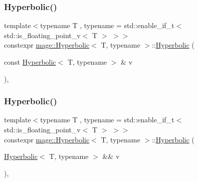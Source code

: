 \subsubsection{\texorpdfstring{Hyperbolic()}{Hyperbolic()}\hspace{0.1cm}{\footnotesize\ttfamily [3/5]}}
{\footnotesize\ttfamily template$<$typename T , typename  = std\+::enable\+\_\+if\+\_\+t$<$ std\+::is\+\_\+floating\+\_\+point\+\_\+v$<$ T $>$ $>$$>$ \\
constexpr \mbox{\hyperlink{structmage_1_1_hyperbolic}{mage\+::\+Hyperbolic}}$<$ T, typename $>$\+::\mbox{\hyperlink{structmage_1_1_hyperbolic}{Hyperbolic}} (\begin{DoxyParamCaption}\item[{const \mbox{\hyperlink{structmage_1_1_hyperbolic}{Hyperbolic}}$<$ T, typename $>$ \&}]{v }\end{DoxyParamCaption})\hspace{0.3cm}{\ttfamily [default]}, {\ttfamily [noexcept]}}

\mbox{\label{structmage_1_1_hyperbolic_af2a6bccf73a3ff0df3d9640d17cbfb37}} 
\subsubsection{\texorpdfstring{Hyperbolic()}{Hyperbolic()}\hspace{0.1cm}{\footnotesize\ttfamily [4/5]}}
{\footnotesize\ttfamily template$<$typename T , typename  = std\+::enable\+\_\+if\+\_\+t$<$ std\+::is\+\_\+floating\+\_\+point\+\_\+v$<$ T $>$ $>$$>$ \\
constexpr \mbox{\hyperlink{structmage_1_1_hyperbolic}{mage\+::\+Hyperbolic}}$<$ T, typename $>$\+::\mbox{\hyperlink{structmage_1_1_hyperbolic}{Hyperbolic}} (\begin{DoxyParamCaption}\item[{\mbox{\hyperlink{structmage_1_1_hyperbolic}{Hyperbolic}}$<$ T, typename $>$ \&\&}]{v }\end{DoxyParamCaption})\hspace{0.3cm}{\ttfamily [default]}, {\ttfamily [noexcept]}}

\mbox{\label{structmage_1_1_hyperbolic_a4c4c2fde770904cbc45e5a7889b1a2e6}} 
